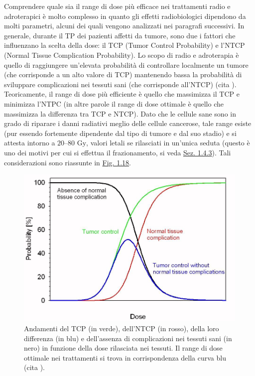 \documentclass[12pt,a4paper,twoside]{report}
\begin{document}
	Comprendere quale sia il range di dose più efficace nei trattamenti radio e adroterapici è molto complesso in quanto gli effetti radiobiologici dipendono da molti parametri, alcuni dei quali vengono analizzati nei paragrafi successivi. In generale, durante il TP dei pazienti affetti da tumore, sono due i fattori che influenzano la scelta della dose: il TCP (Tumor Control Probability) e l'NTCP (Normal Tissue Complication Probability). Lo scopo di radio e adroterapia è quello di raggiungere un'elevata probabilità di controllare localmente un tumore (che corrisponde a un alto valore di TCP) mantenendo bassa la probabilità di sviluppare complicazioni nei tessuti sani (che corrisponde all'NTCP) (cita
	). Teoricamente, il range di dose più efficiente è quello che massimizza il TCP e minimizza l'NTPC (in altre parole il range di dose ottimale è quello che massimizza la differenza tra TCP e NTCP). Dato che le cellule sane sono in grado di riparare i danni radiativi meglio delle cellule cancerose, tale range esiste (pur essendo fortemente dipendente dal tipo di tumore e dal suo stadio) e si attesta intorno a $20$--$80\mbox{ Gy}$, valori letali se rilasciati in un'unica seduta (questo è uno dei motivi per cui si effettua il frazionamento, si veda \hyperref[sec:sopravvivenza_cellulare]{Sez. 1.4.3}). Tali considerazioni sono riassunte in \hyperref[fig:tcp]{Fig. 1.18}.
	\begin{figure}[H]
		\centering
		\includegraphics[width=0.9\linewidth]{tcp.jpg}
		\caption{Andamenti del TCP (in verde), dell'NTCP (in rosso), della loro differenza (in blu) e dell'assenza di complicazioni nei tessuti sani (in nero) in funzione della dose rilasciata nei tessuti. Il range di dose ottimale nei trattamenti si trova in corrispondenza della curva blu (cita
			).}
		\label{fig:tcp}
	\end{figure}
\end{document}
